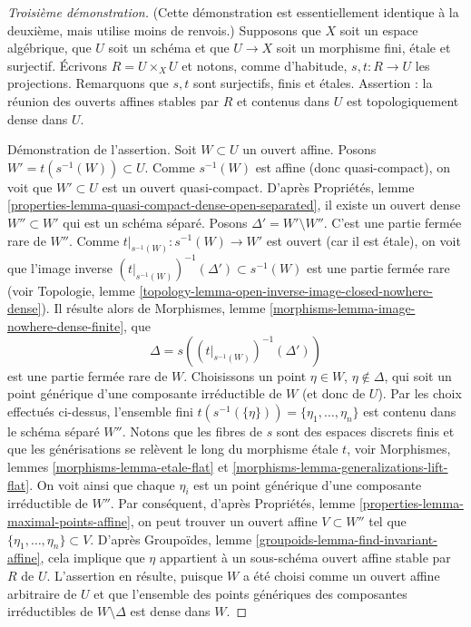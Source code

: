 \begin{proof}[Troisième démonstration]
(Cette démonstration est essentiellement identique à la deuxième, mais
utilise moins de renvois.)
Supposons que $X$ soit un espace algébrique, que $U$ soit un schéma et que
$U \to X$ soit un morphisme fini, étale et surjectif. Écrivons
$R = U \times_X U$ et notons, comme d'habitude,
$s, t : R \to U$ les projections. Remarquons que $s, t$ sont surjectifs,
finis et étales. Assertion : la réunion des ouverts affines stables par $R$
et contenus dans $U$ est topologiquement dense dans $U$.

\medskip\noindent
Démonstration de l'assertion. Soit $W \subset U$ un ouvert affine.
Posons $W' = t(s^{-1}(W)) \subset U$. Comme $s^{-1}(W)$ est affine
(donc quasi-compact), on voit que $W' \subset U$ est un ouvert
quasi-compact. D'après
Propriétés, lemme \ref{properties-lemma-quasi-compact-dense-open-separated},
il existe un ouvert dense $W'' \subset W'$ qui est un schéma séparé.
Posons $\Delta' = W' \setminus W''$. C'est une partie fermée rare de $W''$.
Comme $t|_{s^{-1}(W)} : s^{-1}(W) \to W'$ est ouvert (car il est étale),
on voit que l'image inverse
$(t|_{s^{-1}(W)})^{-1}(\Delta') \subset s^{-1}(W)$
est une partie fermée rare (voir
Topologie, lemme \ref{topology-lemma-open-inverse-image-closed-nowhere-dense}).
Il résulte alors de
Morphismes, lemme \ref{morphisms-lemma-image-nowhere-dense-finite}, que
$$
\Delta = s\left((t|_{s^{-1}(W)})^{-1}(\Delta')\right)
$$
est une partie fermée rare de $W$. Choisissons un point $\eta \in W$,
$\eta \not \in \Delta$, qui soit un point générique d'une composante
irréductible de $W$ (et donc de $U$). Par les choix effectués ci-dessus,
l'ensemble fini
$t(s^{-1}(\{\eta\})) = \{\eta_1, \ldots, \eta_n\}$
est contenu dans le schéma séparé $W''$.
Notons que les fibres de $s$ sont des espaces discrets finis et que les
générisations se relèvent le long du morphisme étale $t$, voir
Morphismes, lemmes \ref{morphisms-lemma-etale-flat}
et \ref{morphisms-lemma-generalizations-lift-flat}.
On voit ainsi que chaque $\eta_i$ est un point générique d'une composante
irréductible de $W''$. Par conséquent, d'après
Propriétés, lemme \ref{properties-lemma-maximal-points-affine},
on peut trouver un ouvert affine $V \subset W''$ tel que
$\{\eta_1, \ldots, \eta_n\} \subset V$.
D'après
Groupoïdes, lemme \ref{groupoids-lemma-find-invariant-affine},
cela implique que $\eta$ appartient à un sous-schéma ouvert affine stable
par $R$ de $U$. L'assertion en résulte, puisque $W$ a été choisi comme un
ouvert affine arbitraire de $U$ et que l'ensemble des points génériques
des composantes irréductibles de $W \setminus \Delta$ est dense dans $W$.


\end{proof}
